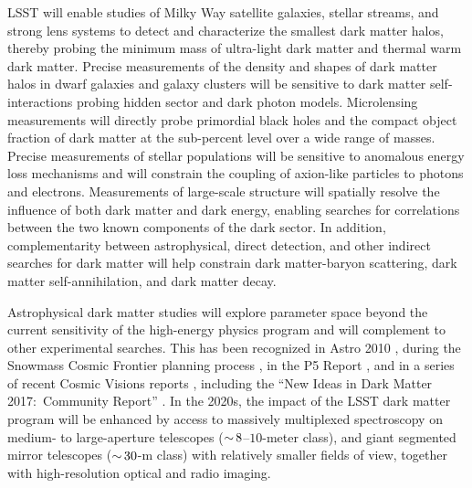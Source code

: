 \documentclass[12pt]{article}
\begin{document}
LSST will enable studies of Milky Way satellite galaxies, stellar streams, and strong lens systems to detect and characterize the smallest dark matter halos, thereby probing the minimum mass of ultra-light dark matter and thermal warm dark matter.
Precise measurements of the density and shapes of dark matter halos in dwarf galaxies and galaxy clusters will be sensitive to dark matter self-interactions probing hidden sector and dark photon models.
Microlensing measurements will directly probe primordial black holes and the compact object fraction of dark matter at the sub-percent level over a wide range of masses.
Precise measurements of stellar populations will be sensitive to anomalous energy loss mechanisms and will constrain the coupling of axion-like particles to photons and electrons.
Measurements of large-scale structure will spatially resolve the influence of both dark matter and dark energy, enabling searches for correlations between the two known components of the dark sector.
In addition, complementarity between astrophysical, direct detection, and other indirect searches for dark matter will help constrain dark matter-baryon scattering, dark matter self-annihilation, and dark matter decay. 

Astrophysical dark matter studies will explore parameter space beyond the current sensitivity of the high-energy physics program and will complement to other experimental searches.
This has been recognized in Astro 2010 \citep{Astro2010}, during the Snowmass Cosmic Frontier planning process \citep[][]{1310.8642, 1310.5662, 1305.1605}, in the P5 Report \citep[]{P5Report}, and in a series of recent Cosmic Visions reports \citep[][]{1604.07626,1802.07216}, including the ``New Ideas in Dark Matter 2017:\ Community Report'' \citep{Battaglieri:2017aum}.
In the 2020s, the impact of the LSST dark matter program will be enhanced by access to massively multiplexed spectroscopy on medium- to large-aperture telescopes ($ {\sim}\, 8$--$10$-meter class), and giant segmented mirror telescopes ($ {\sim}\, 30$-m class) with relatively smaller fields of view, together with high-resolution optical and radio imaging.
\end{document}
